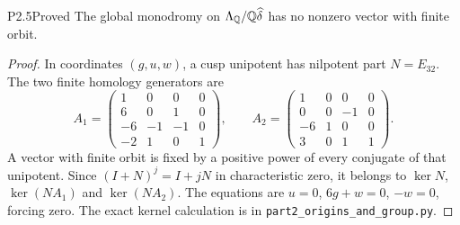\begin{statement}{P2.5}{Proved}
The global monodromy on $\Lambda_\mathbb Q/\mathbb Q\widehat\delta$ has no nonzero vector with finite orbit.
\end{statement}
\begin{proof}
In coordinates $(g,u,w)$, a cusp unipotent has nilpotent part $N=E_{32}$. The two finite homology generators are
\[
 A_1=\begin{pmatrix}1&0&0&0\\6&0&1&0\\-6&-1&-1&0\\-2&1&0&1\end{pmatrix},\qquad
 A_2=\begin{pmatrix}1&0&0&0\\0&0&-1&0\\-6&1&0&0\\3&0&1&1\end{pmatrix}.
\]
A vector with finite orbit is fixed by a positive power of every conjugate of that unipotent. Since $(I+N)^j=I+jN$ in characteristic zero, it belongs to $\ker N$, $\ker(NA_1)$ and $\ker(NA_2)$. The equations are $u=0$, $6g+w=0$, $-w=0$, forcing zero. The exact kernel calculation is in \texttt{part2\_origins\_and\_group.py}.
\end{proof}

